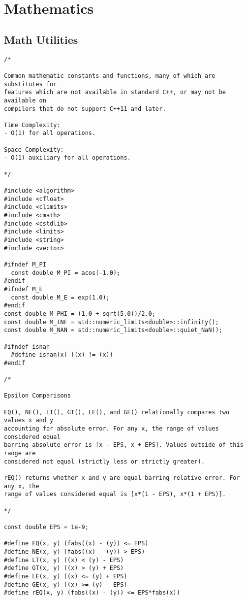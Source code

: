 \chapter{Mathematics}

\section{Math Utilities}
\setcounter{section}{1}
\begin{lstlisting}
/*

Common mathematic constants and functions, many of which are substitutes for
features which are not available in standard C++, or may not be available on
compilers that do not support C++11 and later.

Time Complexity:
- O(1) for all operations.

Space Complexity:
- O(1) auxiliary for all operations.

*/

#include <algorithm>
#include <cfloat>
#include <climits>
#include <cmath>
#include <cstdlib>
#include <limits>
#include <string>
#include <vector>

#ifndef M_PI
  const double M_PI = acos(-1.0);
#endif
#ifndef M_E
  const double M_E = exp(1.0);
#endif
const double M_PHI = (1.0 + sqrt(5.0))/2.0;
const double M_INF = std::numeric_limits<double>::infinity();
const double M_NAN = std::numeric_limits<double>::quiet_NaN();

#ifndef isnan
  #define isnan(x) ((x) != (x))
#endif

/*

Epsilon Comparisons

EQ(), NE(), LT(), GT(), LE(), and GE() relationally compares two values x and y
accounting for absolute error. For any x, the range of values considered equal
barring absolute error is [x - EPS, x + EPS]. Values outside of this range are
considered not equal (strictly less or strictly greater).

rEQ() returns whether x and y are equal barring relative error. For any x, the
range of values considered equal is [x*(1 - EPS), x*(1 + EPS)].

*/

const double EPS = 1e-9;

#define EQ(x, y) (fabs((x) - (y)) <= EPS)
#define NE(x, y) (fabs((x) - (y)) > EPS)
#define LT(x, y) ((x) < (y) - EPS)
#define GT(x, y) ((x) > (y) + EPS)
#define LE(x, y) ((x) <= (y) + EPS)
#define GE(x, y) ((x) >= (y) - EPS)
#define rEQ(x, y) (fabs((x) - (y)) <= EPS*fabs(x))


\end{lstlisting}
